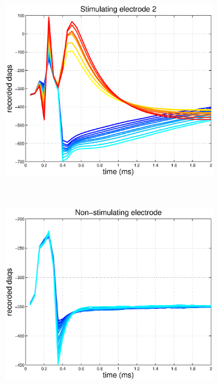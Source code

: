 \documentclass[12pt,letterpaper,fleqn]{article}
\begin{document}
\begin{figure}[ht!]
\begin{subfigure}[b]{0.32\textwidth}
                \includegraphics[width=\textwidth]{ArtMeanS2.eps}
                \caption{}
        \end{subfigure}
       ~ \begin{subfigure}[b]{0.32\textwidth}
                \includegraphics[width=\textwidth]{ArtMeansNS.eps}
                \caption{}


\end{subfigure}
\end{figure}
\end{document}
